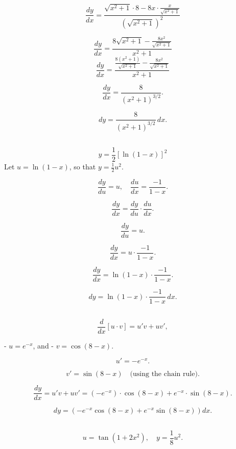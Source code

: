 \documentclass{article}
\begin{document}
\[
\frac{dy}{dx} = \frac{\sqrt{x^2 + 1} \cdot 8 - 8x \cdot \frac{x}{\sqrt{x^2 + 1}}}{(\sqrt{x^2 + 1})^2}
\]

\[
\frac{dy}{dx} = \frac{8\sqrt{x^2 + 1} - \frac{8x^2}{\sqrt{x^2 + 1}}}{x^2 + 1}
\]
\[
\frac{dy}{dx} = \frac{\frac{8(x^2 + 1)}{\sqrt{x^2 + 1}} - \frac{8x^2}{\sqrt{x^2 + 1}}}{x^2 + 1}
\]

\[
\frac{dy}{dx} = \frac{8}{(x^2 + 1)^{3/2}}.
\]


\[
dy = \frac{8}{(x^2 + 1)^{3/2}} \, dx.
\]

\subsection{}

\[
y = \frac{1}{2} \left[ \ln(1 - x) \right]^2
\]
Let \( u = \ln(1 - x) \), so that \( y = \frac{1}{2} u^2 \).

\[
\frac{dy}{du} = u, \quad \frac{du}{dx} = \frac{-1}{1 - x}.
\]


\[
\frac{dy}{dx} = \frac{dy}{du} \cdot \frac{du}{dx}.
\]

\[
\frac{dy}{du} = u.
\]

\[
\frac{dy}{dx} = u \cdot \frac{-1}{1 - x}.
\]

\[
\frac{dy}{dx} = \ln(1 - x) \cdot \frac{-1}{1 - x}.
\]


\[
dy = \ln(1 - x) \cdot \frac{-1}{1 - x} \, dx.
\]

\subsection{}


\[
\frac{d}{dx} [u \cdot v] = u'v + uv',
\]

- \( u = e^{-x} \), and
- \( v = \cos(8 - x) \).



\[
u' = -e^{-x}.
\]



\[
v' = \sin(8 - x) \quad \text{(using the chain rule)}.
\]


\[
\frac{dy}{dx} = u'v + uv' = (-e^{-x}) \cdot \cos(8 - x) + e^{-x} \cdot \sin(8 - x).
\]


\[
dy = \left( -e^{-x} \cos(8 - x) + e^{-x} \sin(8 - x) \right) dx.
\]


\subsection{}

\[
u = \tan(1 + 2x^2), \quad y = \frac{1}{8} u^2.
\]
\end{document}
